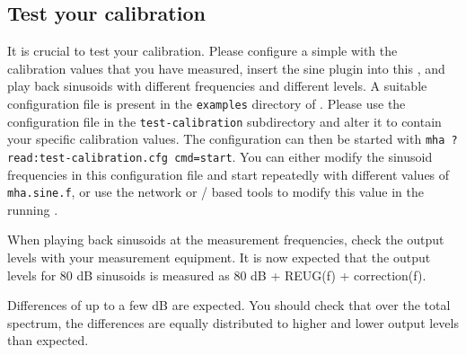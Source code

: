 \documentclass[11pt,a4paper,twoside]{article}
\newcommand{\+}{\discretionary{\mbox{\scriptsize$\hookleftarrow$}}{}{}}
\begin{document}
\subsection{Test your calibration}

It is crucial to test your calibration. Please configure a simple \mha{} with the
calibration values that you have measured, insert the sine plugin into this \mha{},
and play back sinusoids with different frequencies and different levels.
%
A suitable configuration file is present in the \texttt{examples} directory of \mha{}.
%
Please use the configuration file in the \texttt{test-calibration} subdirectory
and alter it to contain your specific calibration values.
%
The configuration can then be started with
\texttt{mha ?read:test-calibration.cfg cmd=start}.
%
You can either modify the sinusoid frequencies in this configuration
file and start \mha{} repeatedly with different values of
\texttt{mha.sine.f}, or use the network or \Octave{}/\Matlab{} based
tools to modify this value in the running \mha{}.

When playing back sinusoids at the measurement frequencies, check the output levels with your
measurement equipment. It is now expected that the output levels for 80 dB sinusoids is measured as 80 dB + REUG(f) + correction(f).

Differences of up to a few dB are expected. You should check that over
the total spectrum, the differences are equally distributed to higher
and lower output levels than expected.



\printindex
\end{document}
